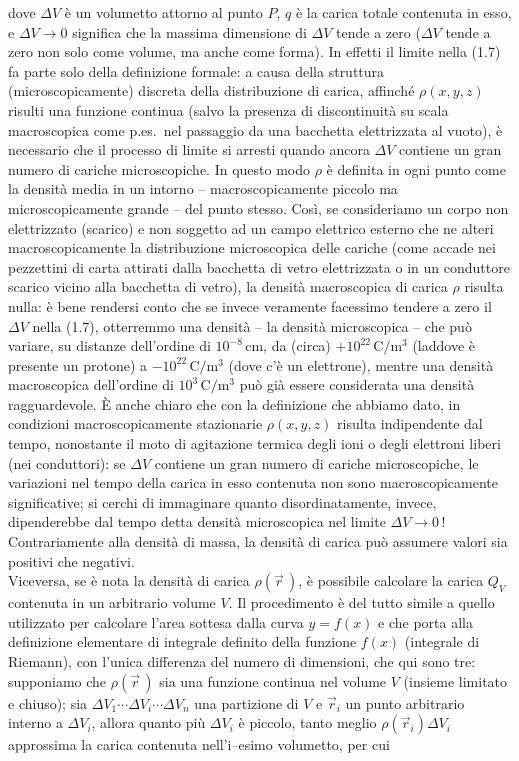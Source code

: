 dove $\Delta V$ è un volumetto attorno al punto $P$, $q$ è la carica totale contenuta in esso, e $\Delta V\to0$ significa che la massima dimensione di $\Delta V$ tende a zero ($\Delta V$ tende a zero non solo come volume, ma anche come forma). In effetti il limite nella (1.7) fa parte solo della definizione formale: a causa della struttura (microscopicamente) discreta della distribuzione di carica, affinché $\rho(x,y,z)$ risulti una funzione continua (salvo la presenza di discontinuità su scala macroscopica come p.es.\ nel passaggio da una bacchetta elettrizzata al vuoto), è necessario che il processo di limite si arresti quando ancora $\Delta V$ contiene un gran numero di cariche microscopiche. In questo modo $\rho$ è definita in ogni punto come la densità media in un intorno -- macroscopicamente piccolo ma microscopicamente grande -- del punto stesso. Così, se consideriamo un corpo non elettrizzato (scarico) e non soggetto ad un campo elettrico esterno che ne alteri macroscopicamente la distribuzione microscopica delle cariche (come accade nei pezzettini di carta attirati dalla bacchetta di vetro elettrizzata o in un conduttore scarico vicino alla bacchetta di vetro), la densità macroscopica di carica $\rho$ risulta nulla: è bene rendersi conto che se invece veramente facessimo tendere a zero il $\Delta V$ nella (1.7), otterremmo una densità -- la densità microscopica -- che può variare, su distanze dell'ordine di $10^{-8}\,\mathrm{cm}$, da (circa) $+10^{22}\,\mathrm{C/m^3}$ (laddove è presente un protone) a $-10^{22}\,\mathrm{C/m^3}$ (dove c'è un elettrone), mentre una densità macroscopica dell'ordine di $10^3\,\mathrm{C/m^3}$ può già essere considerata una densità ragguardevole. È anche chiaro che con la definizione che abbiamo dato, in condizioni macroscopicamente stazionarie $\rho(x,y,z)$ risulta indipendente dal tempo, nonostante il moto di agitazione termica degli ioni o degli elettroni liberi (nei conduttori): se $\Delta V$ contiene un gran numero di cariche microscopiche, le variazioni nel tempo della carica in esso contenuta non sono macroscopicamente significative; si cerchi di immaginare quanto disordinatamente, invece, dipenderebbe dal tempo detta densità microscopica nel limite $\Delta V\to0\,$!\\
Contrariamente alla densità di massa, la densità di carica può assumere valori sia positivi che negativi.\\
Viceversa, se è nota la densità di carica $\rho(\vec r\,)$, è possibile calcolare la carica $Q_V$ contenuta in un arbitrario volume $V$. Il procedimento è del tutto simile a quello utilizzato per calcolare l'area sottesa dalla curva $y=f(x)$ e che porta alla definizione elementare di integrale definito della funzione $f(x)$ (integrale di Riemann), con l'unica differenza del numero di dimensioni, che qui sono tre: supponiamo che $\rho(\vec r\,)$ sia una funzione continua nel volume $V$ (insieme limitato e chiuso); sia $\Delta V_1\cdots\Delta V_i\cdots\Delta V_n$ una partizione di $V$ e $\vec r_i$ un punto arbitrario interno a $\Delta V_i$, allora quanto più $\Delta V_i$ è piccolo, tanto meglio $\rho(\vec r_i)\Delta V_i$ approssima la carica contenuta nell'i--esimo volumetto, per cui
